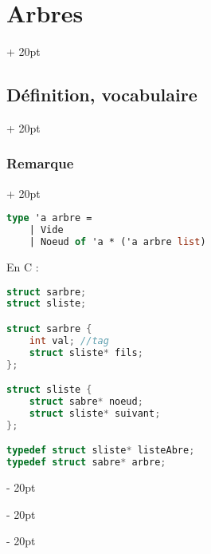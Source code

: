 \documentclass[a4paper, 12pt, twoside]{article}
\newcommand{\ind}[1][20pt]{\advance\leftskip + #1}
\newcommand{\deind}[1][20pt]{\advance\leftskip - #1}
\newenvironment{indt}[2][20pt]{#2 \par \ind[#1]}{\par \deind} %
\begin{document}
\begin{indt}{\section{Arbres}}
\begin{indt}{\subsection{Définition, vocabulaire}}
\begin{indt}{\subsubsection{Remarque}}
                \begin{lstlisting}[language=Caml, xleftmargin=80pt]
type 'a arbre = 
    | Vide
    | Noeud of 'a * ('a arbre list)\end{lstlisting}
                
                En C :
                \begin{lstlisting}[language=C, xleftmargin=80pt]
struct sarbre;
struct sliste;

struct sarbre {
    int val; //tag
    struct sliste* fils;
};

struct sliste {
    struct sabre* noeud;
    struct sliste* suivant;
};

typedef struct sliste* listeAbre;
typedef struct sabre* arbre;\end{lstlisting}
                
                \begin{center}
\end{center}
\end{indt}
\end{indt}
\end{indt}
\end{document}
